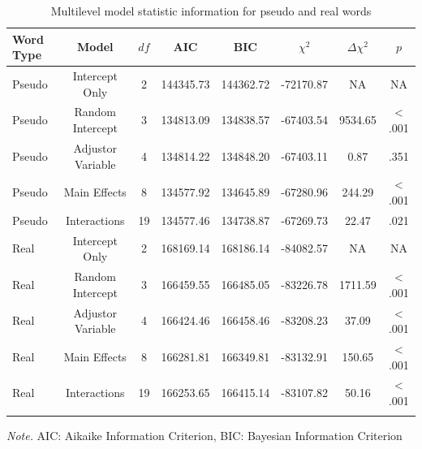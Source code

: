 \documentclass[
  english,
  man,mask]{apa7}
\begin{document}
\begin{table}[tbp]

\begin{center}
\begin{threeparttable}

\caption{\label{tab:model-table1}Multilevel model statistic information for pseudo and real words}

\begin{tabular}{lccccccc}
\toprule
Word Type & Model & $df$ & AIC & BIC & $\chi^2$ & $\Delta\chi^2$ & $p$\\
\midrule
Pseudo & Intercept Only & 2 & 144345.73 & 144362.72 & -72170.87 & NA & NA\\
Pseudo & Random Intercept & 3 & 134813.09 & 134838.57 & -67403.54 & 9534.65 & < .001\\
Pseudo & Adjustor Variable & 4 & 134814.22 & 134848.20 & -67403.11 & 0.87 & .351\\
Pseudo & Main Effects & 8 & 134577.92 & 134645.89 & -67280.96 & 244.29 & < .001\\
Pseudo & Interactions & 19 & 134577.46 & 134738.87 & -67269.73 & 22.47 & .021\\
Real & Intercept Only & 2 & 168169.14 & 168186.14 & -84082.57 & NA & NA\\
Real & Random Intercept & 3 & 166459.55 & 166485.05 & -83226.78 & 1711.59 & < .001\\
Real & Adjustor Variable & 4 & 166424.46 & 166458.46 & -83208.23 & 37.09 & < .001\\
Real & Main Effects & 8 & 166281.81 & 166349.81 & -83132.91 & 150.65 & < .001\\
Real & Interactions & 19 & 166253.65 & 166415.14 & -83107.82 & 50.16 & < .001\\
\bottomrule
\addlinespace
\end{tabular}

\begin{tablenotes}[para]
\normalsize{\textit{Note.} AIC: Aikaike Information Criterion, BIC: Bayesian Information Criterion}
\end{tablenotes}

\end{threeparttable}
\end{center}

\end{table}
\end{document}

